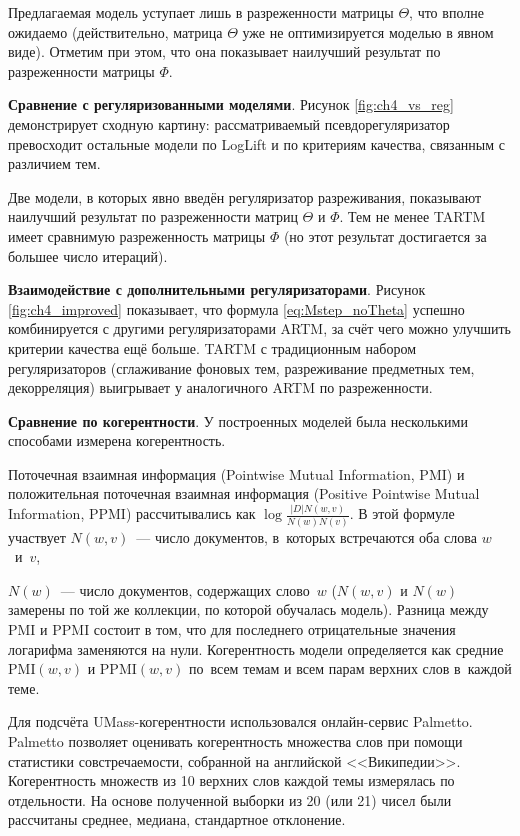 Предлагаемая модель уступает лишь в разреженности матрицы $\Theta$, что вполне ожидаемо (действительно, матрица $\Theta$ уже не оптимизируется моделью в явном виде). Отметим при этом, что она показывает наилучший результат по разреженности матрицы $\Phi$.

\textbf{Сравнение с регуляризованными моделями}. Рисунок \ref{fig:ch4_vs_reg} демонстрирует сходную картину: рассматриваемый псевдорегуляризатор превосходит остальные модели по LogLift и по критериям качества, связанным с различием тем.

Две модели, в которых явно введён регуляризатор разреживания, показывают наилучший результат по разреженности матриц $\Theta$ и $\Phi$. Тем не менее TARTM имеет сравнимую разреженность матрицы $\Phi$ (но этот результат достигается за большее число итераций).

\textbf{Взаимодействие с дополнительными регуляризаторами}. Рисунок \ref{fig:ch4_improved} показывает, что формула \eqref{eq:Mstep_noTheta} успешно комбинируется с другими регуляризаторами ARTM, за счёт чего можно улучшить критерии качества ещё больше. TARTM с традиционным набором регуляризаторов (сглаживание фоновых тем, разреживание предметных тем, декорреляция) выигрывает у аналогичного ARTM по разреженности.




\textbf{Сравнение по когерентности}. У построенных моделей была несколькими способами измерена когерентность.

Поточечная взаимная информация (Pointwise Mutual Information, PMI) и положительная поточечная взаимная информация (Positive Pointwise Mutual Information, PPMI) рассчитывались как $\log\frac{|D| N(w,v)}{N(w)N(v)}$. В этой формуле участвует $N(w,v)$~--- число документов, в~которых встречаются оба слова $w$~и~$v$,

$N(w)$~--- число документов, содержащих слово~$w$ ($N(w,v)$ и $N(w)$ замерены по той же коллекции, по которой обучалась модель). Разница между PMI и PPMI состоит в том, что для последнего отрицательные значения логарифма заменяются на нули. Когерентность модели определяется как средние $\mathrm{PMI}(w,v)$ и $\mathrm{PPMI}(w,v)$ по~всем темам и всем парам верхних слов в~каждой теме.

Для подсчёта UMass-когерентности использовался онлайн-сервис Palmetto. Palmetto позволяет оценивать когерентность множества слов при помощи статистики совстречаемости, собранной на английской <<Википедии>>. Когерентность множеств из 10 верхних слов каждой темы измерялась по отдельности. На основе полученной выборки из 20 (или 21) чисел были рассчитаны среднее, медиана, стандартное отклонение.


